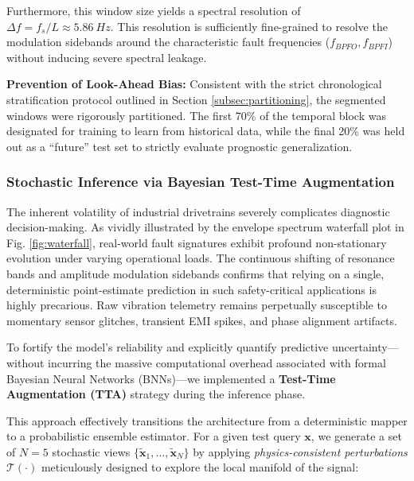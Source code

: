\documentclass[5p,times,twocolumn]{elsarticle}
\begin{document}
Furthermore, this window size yields a spectral resolution of $\Delta f = f_s / L \approx \SI{5.86}{Hz}$. This resolution is sufficiently fine-grained to resolve the modulation sidebands around the characteristic fault frequencies ($f_{BPFO}, f_{BPFI}$) without inducing severe spectral leakage.

\textbf{Prevention of Look-Ahead Bias:} Consistent with the strict chronological stratification protocol outlined in Section \ref{subsec:partitioning}, the segmented windows were rigorously partitioned. The first 70\% of the temporal block was designated for training to learn from historical data, while the final 20\% was held out as a ``future'' test set to strictly evaluate prognostic generalization.

\subsubsection{Stochastic Inference via Bayesian Test-Time Augmentation}

The inherent volatility of industrial drivetrains severely complicates diagnostic decision-making. As vividly illustrated by the envelope spectrum waterfall plot in Fig. \ref{fig:waterfall}, real-world fault signatures exhibit profound non-stationary evolution under varying operational loads. The continuous shifting of resonance bands and amplitude modulation sidebands confirms that relying on a single, deterministic point-estimate prediction in such safety-critical applications is highly precarious. Raw vibration telemetry remains perpetually susceptible to momentary sensor glitches, transient EMI spikes, and phase alignment artifacts. 

To fortify the model's reliability and explicitly quantify predictive uncertainty---without incurring the massive computational overhead associated with formal Bayesian Neural Networks (BNNs)---we implemented a \textbf{Test-Time Augmentation (TTA)} strategy during the inference phase.

This approach effectively transitions the architecture from a deterministic mapper to a probabilistic ensemble estimator. For a given test query $\mathbf{x}$, we generate a set of $N=5$ stochastic views $\{\tilde{\mathbf{x}}_1, \dots, \tilde{\mathbf{x}}_N\}$ by applying \textit{physics-consistent perturbations} $\mathcal{T}(\cdot)$ meticulously designed to explore the local manifold of the signal:
\end{document}
